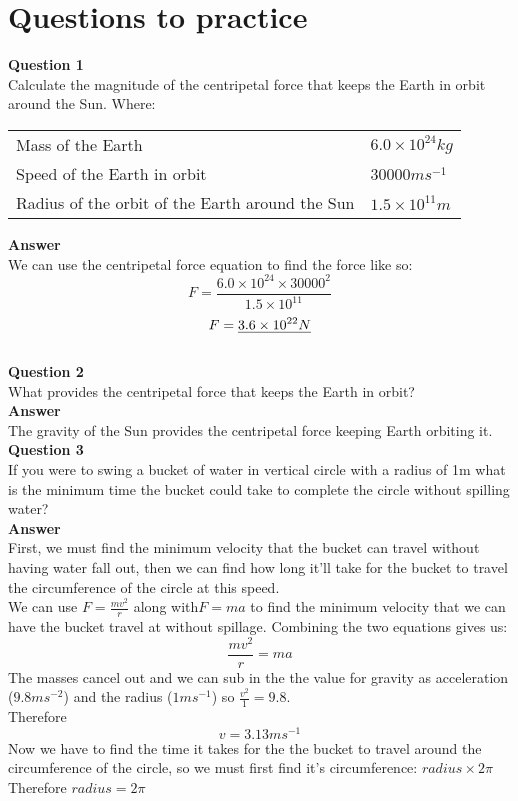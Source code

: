 \documentclass{article}
\begin{document}
\section*{Questions to practice}
\textbf{Question 1}\\
Calculate the magnitude of the centripetal force that keeps the Earth in orbit around the Sun.
Where:
\begin{center}
	\begin{tabular}{ l l }
		Mass of the Earth & $6.0\times10^{24}kg$ \\
		Speed of the Earth in orbit & $30000ms^{-1}$ \\
		Radius of the orbit of the Earth around the Sun & $1.5\times10^{11}m$
	\end{tabular}
\end{center}
\textbf{Answer}\\
We can use the centripetal force equation to find the force like so:
\[
	F = \frac{6.0\times10^{24} \times 30000^2}{1.5\times10^{11}}
\]
\[
	F = \uline{3.6 \times 10^{22}N}
\]
\\[3ex]
\noindent
\textbf{Question 2}\\
What provides the centripetal force that keeps the Earth in orbit?
\\[3ex]
\noindent
\textbf{Answer} \\
The gravity of the Sun provides the centripetal force keeping Earth orbiting it.
\\[3ex]
\noindent
\textbf{Question 3}\\
If you were to swing a bucket of water in vertical circle with a radius of 1m what is the minimum time the bucket could take to complete the circle without spilling water?
\\[3ex]
\noindent
\textbf{Answer} \\
First, we must find the minimum velocity that the bucket can travel without having water fall out, then we can find how long it'll take for the bucket to travel the circumference of the circle at this speed.
\\[3ex]
\noindent
We can use $F = \frac{mv^2}{r}$ along with$F = ma$ to find the minimum velocity that we can have the bucket travel at without spillage. Combining the two equations gives us:
\[
	\frac{mv^2}{r} = ma
\]
The masses cancel out and we can sub in the the value for gravity as acceleration ($9.8ms^{-2}$) and the radius ($1ms^{-1}$) so $\frac{v^2}{1} = 9.8$.
\\[3ex]
\noindent
Therefore 
\[
	v = 3.13ms^{-1}
\]
Now we have to find the time it takes for the the bucket to travel around the circumference of the circle, so we must first find it's circumference: $radius \times 2\pi$ Therefore $radius = 2\pi$
\end{document}
